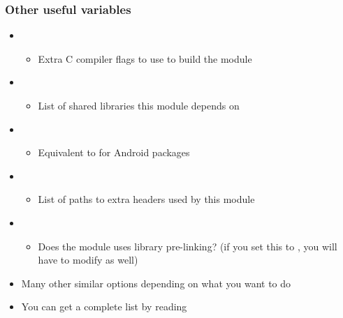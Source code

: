 \begin{frame}
  \frametitle{Other useful variables}
  \begin{itemize}
  \item {}
    \begin{itemize}
    \item Extra C compiler flags to use to build the module
    \end{itemize}
  \item {}
    \begin{itemize}
    \item List of shared libraries this module depends on
    \end{itemize}
  \item {}
    \begin{itemize}
    \item Equivalent to  for Android packages
    \end{itemize}
  \item {}
    \begin{itemize}
    \item List of paths to extra headers used by this module
    \end{itemize}
  \item {}
    \begin{itemize}
    \item Does the module uses library pre-linking? (if you set this
      to , you will have to modify
       as well)
    \end{itemize}
  \item Many other similar options depending on what you want to
    do
  \item You can get a complete list by reading
  \end{itemize}
\end{frame}

